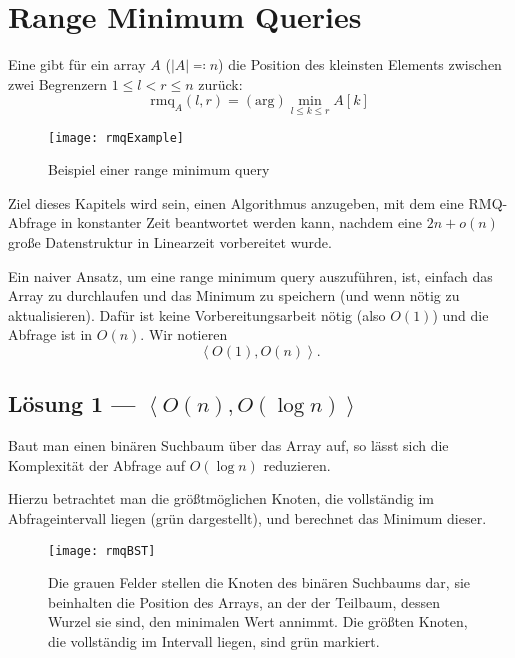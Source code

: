 \chapter{Range Minimum Queries}

Eine  gibt für ein array \( A \) (\( \left\vert A \right\vert \eqqcolon n \)) die Position des kleinsten Elements zwischen zwei Begrenzern \( 1 \leq l < r \leq n \) zurück:
\begin{equation*}
  \text{rmq}_A(l,r) = (\text{arg})\min_{l \leq k \leq r}A[k]
\end{equation*}

\begin{figure}[H]
  \texttt{[image: rmqExample]}
  \caption{Beispiel einer range minimum query}
\end{figure}

Ziel dieses Kapitels wird sein, einen Algorithmus anzugeben, mit dem eine RMQ-Abfrage in konstanter Zeit beantwortet werden kann, nachdem eine \( 2n + o(n) \) große Datenstruktur in Linearzeit vorbereitet wurde.

Ein naiver Ansatz, um eine range minimum query auszuführen, ist, einfach das Array zu durchlaufen und das Minimum zu speichern (und wenn nötig zu aktualisieren). Dafür ist keine Vorbereitungsarbeit nötig (also \( O(1) \)) und die Abfrage ist in \( O(n) \). Wir notieren
\begin{equation*}
  \left\langle O(1), O(n) \right\rangle\text{.}
\end{equation*}

\section{Lösung 1 --- \( \left\langle O(n), O(\log n) \right\rangle \)}

Baut man einen binären Suchbaum über das Array auf, so lässt sich die Komplexität der Abfrage auf \( O(\log n) \) reduzieren.

Hierzu betrachtet man die größtmöglichen Knoten, die vollständig im Abfrageintervall liegen (grün dargestellt), und berechnet das Minimum dieser.

\begin{figure}[H]
  \texttt{[image: rmqBST]}
  \caption{Die grauen Felder stellen die Knoten des binären Suchbaums dar, sie beinhalten die Position des Arrays, an der der Teilbaum, dessen Wurzel sie sind, den minimalen Wert annimmt. Die größten Knoten, die vollständig im Intervall liegen, sind grün markiert.}
\end{figure}

